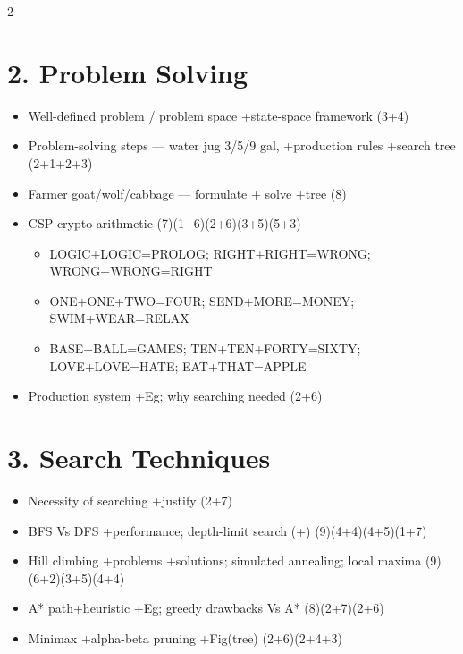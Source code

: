\documentclass[10pt]{article}
\begin{document}
\begin{multicols}{2}
\section*{2. Problem Solving}
\begin{itemize}
  \item Well-defined problem / problem space +state-space framework \hfill (3+4)
  \item Problem-solving steps --- water jug 3/5/9 gal, +production rules +search tree \hfill (2+1+2+3)
  \item Farmer goat/wolf/cabbage --- formulate + solve +tree \hfill (8)
  \item CSP crypto-arithmetic \hfill (7)(1+6)(2+6)(3+5)(5+3)
    \begin{itemize}
      \item LOGIC+LOGIC=PROLOG; RIGHT+RIGHT=WRONG; WRONG+WRONG=RIGHT
      \item ONE+ONE+TWO=FOUR; SEND+MORE=MONEY; SWIM+WEAR=RELAX
      \item BASE+BALL=GAMES; TEN+TEN+FORTY=SIXTY; LOVE+LOVE=HATE; EAT+THAT=APPLE
    \end{itemize}
  \item Production system +Eg; why searching needed \hfill (2+6)
\end{itemize}

\section*{3. Search Techniques}
\begin{itemize}
  \item Necessity of searching +justify \hfill (2+7)
  \item BFS Vs DFS +performance; depth-limit search (+) \hfill (9)(4+4)(4+5)(1+7)
  \item Hill climbing +problems +solutions; simulated annealing; local maxima \hfill (9)(6+2)(3+5)(4+4)
  \item A* path+heuristic +Eg; greedy drawbacks Vs A* \hfill (8)(2+7)(2+6)
  \item Minimax +alpha-beta pruning +Fig(tree) \hfill (2+6)(2+4+3)
\end{itemize}


\end{multicols}
\end{document}
